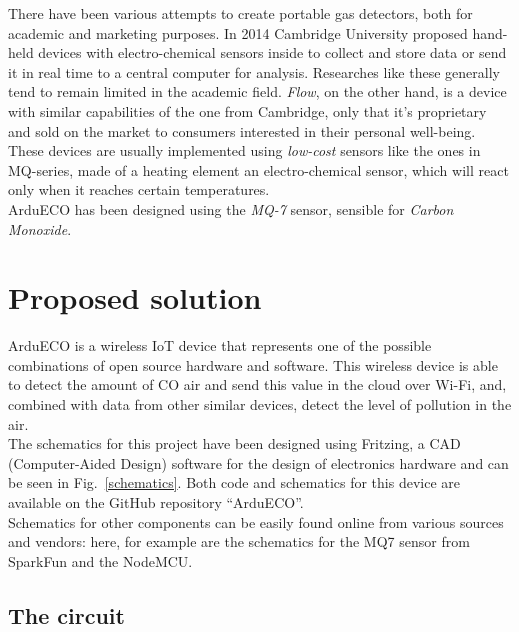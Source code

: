 \documentclass[conference]{IEEEtran}
\begin{document}
	There have been various attempts to create portable gas detectors, both for academic and marketing purposes.
	In 2014 Cambridge University proposed hand-held devices with electro-chemical sensors inside to collect and store data or send it in real time to a central computer for analysis\cite{cambridge}.
	Researches like these generally tend to remain limited in the academic field.
	\textit{Flow}\cite{flow}, on the other hand, is a device with similar capabilities of the one from Cambridge, only that it's proprietary and sold on the market to consumers interested in their personal well-being.\\
	These devices are usually implemented using \textit{low-cost} sensors like the ones in MQ-series, made of a heating element an electro-chemical sensor, which will react only when it reaches certain temperatures.\\
	ArduECO has been designed using the \textit{MQ-7} sensor, sensible for \textit{Carbon Monoxide}.
	
\section{Proposed solution}\label{solution}
	
	ArduECO is a wireless IoT device that represents one of the possible combinations of open source hardware and software.
	This wireless device is able to detect the amount of CO air and send this value in the cloud over Wi-Fi, and, combined with data from other similar devices, detect the level of pollution in the air.\\
	The schematics for this project have been designed using Fritzing, a CAD (Computer-Aided Design) software for the design of electronics hardware\cite{fritzing} and can be seen in Fig.~\ref{schematics}.
	Both code and schematics for this device are available on the GitHub repository ``ArduECO''\cite{ardueco_git}.\\
	Schematics for other components can be easily found online from various sources and vendors: here, for example are the schematics for the MQ7 sensor from SparkFun\cite{spark_mq} and the NodeMCU\cite{node_scheme}.
	
	\subsection{The circuit}\label{circuit}
	
\end{document}
